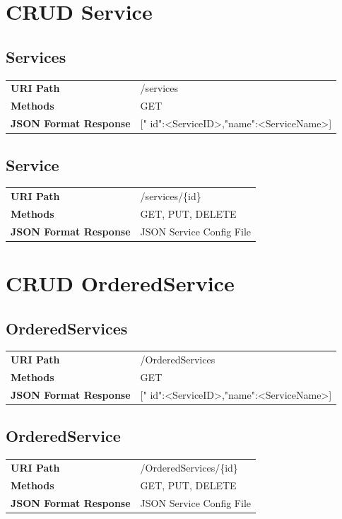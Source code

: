 \documentclass[11pt]{scrartcl}
\begin{document}
\newpage

\section{CRUD Service}
\subsection{Services}
\begin{tabularx}{\linewidth}{l l}
\textbf{URI Path} & /services\\
\textbf{Methods} & GET\\
\textbf{JSON Format Response} & [{" id":<ServiceID>,"name":<ServiceName>}]\\
\end{tabularx}

\subsection{Service}


\begin{tabularx}{\linewidth}{l l}
\textbf{URI Path} & /services/\{id\}\\
\textbf{Methods} & GET, PUT, DELETE\\
\textbf{JSON Format Response} & JSON Service Config File\\
\end{tabularx}

\section{CRUD OrderedService}
\subsection{OrderedServices}
\begin{tabularx}{\linewidth}{l l}
\textbf{URI Path} & /OrderedServices\\
\textbf{Methods} & GET\\
\textbf{JSON Format Response} & [{" id":<ServiceID>,"name":<ServiceName>}]\\
\end{tabularx}

\subsection{OrderedService}
\begin{tabularx}{\linewidth}{l l}
\textbf{URI Path} & /OrderedServices/\{id\}\\
\textbf{Methods} & GET, PUT, DELETE\\
\textbf{JSON Format Response} & JSON Service Config File\\
\end{tabularx}
\end{document}
